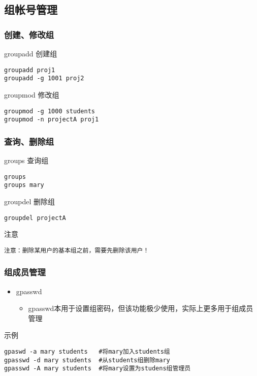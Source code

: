 \documentclass[xcolor=svgnames,presentation]{beamer}
\begin{document}
\subsection{组帐号管理}
\label{sec-1-4}
\begin{frame}[fragile]
\frametitle{创建、修改组}
\label{sec-1-4-1}
\begin{exampleblock}{groupadd 创建组}
\label{sec-1-4-1-1}


\begin{verbatim}
groupadd proj1
groupadd -g 1001 proj2
\end{verbatim}
\end{exampleblock}
\begin{exampleblock}{groupmod 修改组}
\label{sec-1-4-1-2}


\begin{verbatim}
groupmod -g 1000 students
groupmod -n projectA proj1
\end{verbatim}
\end{exampleblock}
\end{frame}
\begin{frame}[fragile]
\frametitle{查询、删除组}
\label{sec-1-4-2}
\begin{exampleblock}{groups 查询组}
\label{sec-1-4-2-1}


\begin{verbatim}
groups
groups mary
\end{verbatim}
\end{exampleblock}
\begin{exampleblock}{groupdel 删除组}
\label{sec-1-4-2-2}


\begin{verbatim}
groupdel projectA
\end{verbatim}
\end{exampleblock}
\begin{block}{注意}
\label{sec-1-4-2-3}


\begin{verbatim}
注意：删除某用户的基本组之前，需要先删除该用户！
\end{verbatim}
\end{block}
\end{frame}
\begin{frame}[fragile]
\frametitle{组成员管理}
\label{sec-1-4-3}
\begin{itemize}

\item gpasswd
\label{sec-1-4-3-1}%
\begin{itemize}

\item gpasswd本用于设置组密码，但该功能极少使用，实际上更多用于组成员管理
\label{sec-1-4-3-1-1}%
\end{itemize} %
\end{itemize} %
\begin{exampleblock}{示例}
\label{sec-1-4-3-2}


\begin{verbatim}
gpaswd -a mary students   #将mary加入students组
gpasswd -d mary students  #从students组删除mary
gpasswd -A mary students  #将mary设置为studens组管理员
\end{verbatim}
\end{exampleblock}
\end{frame}
\end{document}
